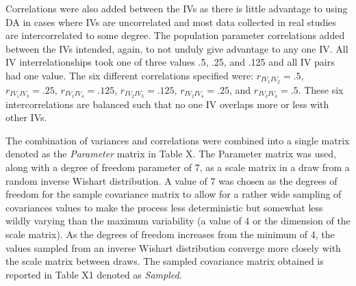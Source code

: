 \documentclass[ShortAfour,times,sageapa]{sagej}
\begin{document}
	Correlations were also added between the IVs as there is little advantage to using DA in cases where IVs are uncorrelated and most data collected in real studies are intercorrelated to some degree.  
	The population parameter correlations added between the IVs intended, again, to not unduly give advantage to any one IV.  
	All IV interrelationships took one of three values .5, .25, and .125 and all IV pairs had one value.  The six different correlations specified were: $r_{IV_1 IV_2} = .5$, $r_{IV_1 IV_3} = .25$, $r_{IV_1 IV_4} = .125$, $r_{IV_2 IV_3} = .125$, $r_{IV_2 IV_4} = .25$, and $r_{IV_3 IV_4} = .5$.  
	These six intercorrelations are balanced such that no one IV overlaps more or less with other IVs.

	The combination of variances and correlations were combined into a single matrix denoted as the \emph{Parameter} matrix in Table X.
	The Parameter matrix was used, along with a degree of freedom parameter of 7, as a scale matrix in a draw from a random inverse Wishart distribution.  
	A value of 7 was chosen as the degrees of freedom for the sample covariance matrix to allow for a rather wide sampling of covariances values to make the process less deterministic but somewhat less wildly varying than the maximum variability (a value of 4 or the dimension of the scale matrix).  As the degrees of freedom increases from the minimum of 4, the values sampled from an inverse Wishart distribution converge more closely with the scale matrix between draws.
	The sampled covariance matrix obtained is reported in Table X1 denoted as \emph{Sampled}.
	
\end{document}
